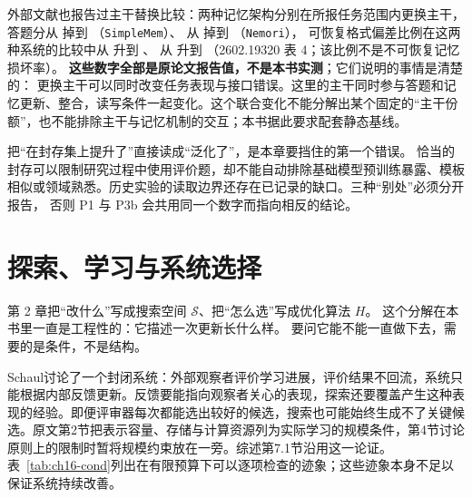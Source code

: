 \begin{sloppypar}
外部文献也报告过主干替换比较：两种记忆架构分别在所报任务范围内更换主干，答题分从  掉到 （\texttt{SimpleMem}）、
从  掉到 （\texttt{Nemori}），
可恢复格式偏差比例在这两种系统的比较中从  升到 、
从  升到 （2602.19320 表 4；该比例不是不可恢复记忆损坏率）\cite{anatomy-memory-2602}。
\textbf{这些数字全部是原论文报告值，不是本书实测}；它们说明的事情是清楚的：
更换主干可以同时改变任务表现与接口错误。这里的主干同时参与答题和记忆更新、整合，读写条件一起变化。这个联合变化不能分解出某个固定的“主干份额”，也不能排除主干与记忆机制的交互；本书据此要求配套静态基线。
\end{sloppypar}

\begin{pitfallbox}
把“在封存集上提升了”直接读成“泛化了”，是本章要挡住的第一个错误。
恰当的封存可以限制研究过程中使用评价题，却不能自动排除基础模型预训练暴露、模板相似或领域熟悉。历史实验的读取边界还存在已记录的缺口。三种“别处”必须分开报告，
否则 P1 与 P3b 会共用同一个数字而指向相反的结论。
\end{pitfallbox}

\section{探索、学习与系统选择}
\label{sec:ch16-select}

\begin{sloppypar}
第 2 章把“改什么”写成搜索空间 $\mathcal S$、把“怎么选”写成优化算法 $H$。
这个分解在本书里一直是工程性的：它描述一次更新长什么样。
要问它能不能一直做下去，需要的是条件，不是结构。
\end{sloppypar}

\begin{sloppypar}
Schaul讨论了一个封闭系统：外部观察者评价学习进展，评价结果不回流，系统只能根据内部反馈更新\cite{schaul-socratic-2411}。反馈要能指向观察者关心的表现，探索还要覆盖产生这种表现的经验。即便评审器每次都能选出较好的候选，搜索也可能始终生成不了关键候选。原文第2节把表示容量、存储与计算资源列为实际学习的规模条件，第4节讨论原则上的限制时暂将规模约束放在一旁。综述第7.1节沿用这一论证\cite{rsi-survey-2607}。表~\ref{tab:ch16-cond}列出在有限预算下可以逐项检查的迹象；这些迹象本身不足以保证系统持续改善。

\end{sloppypar}

